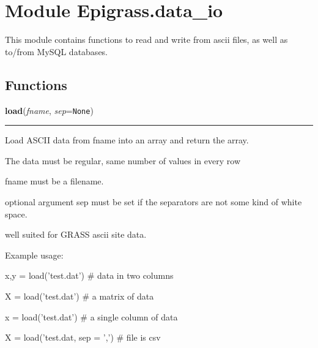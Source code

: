 %
%
%


\section{Module Epigrass.data\_io}

    \label{Epigrass:data_io}
This module contains functions to read and write from ascii files, as well 
as to/from MySQL databases.



  \subsection{Functions}

    \label{Epigrass:data_io:load}

    \vspace{0.5ex}

    \begin{boxedminipage}{\textwidth}

    \raggedright \textbf{load}(\textit{fname}, \textit{sep}=\texttt{None})

    \vspace{-1.5ex}

    \rule{\textwidth}{0.5\fboxrule}
    Load ASCII data from fname into an array and return the array.

    The data must be regular, same number of values in every row

    fname must be a filename.

    optional argument sep must be set if the separators are not some kind 
    of white space.

    well suited for GRASS ascii site data.

    Example usage:

\begin{alltt}
\end{alltt}

    x,y = load('test.dat')  \# data in two columns

    X = load('test.dat')    \# a matrix of data

    x = load('test.dat')    \# a single column of data

    X = load('test.dat, sep = ',') \# file is csv

    \vspace{1ex}

    \end{boxedminipage}

